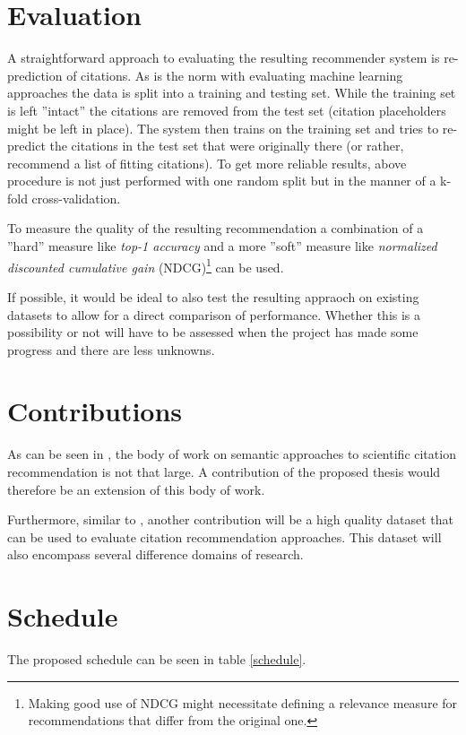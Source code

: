 \documentclass{proseminar}
\begin{document}
\section{Evaluation}
A straightforward approach to evaluating the resulting recommender system is re-prediction of citations. As is the norm with evaluating machine learning approaches the data is split into a training and testing set. While the training set is left ''intact'' the citations are removed from the test set (citation placeholders might be left in place). The system then trains on the training set and tries to re-predict the citations in the test set that were originally there (or rather, recommend a list of fitting citations). To get more reliable results, above procedure is not just performed with one random split but in the manner of a k-fold cross-validation.

To measure the quality of the resulting recommendation a combination of a ''hard'' measure like \emph{top-1 accuracy} and a more ''soft'' measure like \emph{normalized discounted cumulative gain} (NDCG)\footnote{Making good use of NDCG might necessitate defining a relevance measure for recommendations that differ from the original one.} can be used.

If possible, it would be ideal to also test the resulting appraoch on existing datasets to allow for a direct comparison of performance. Whether this is a possibility or not will have to be assessed when the project has made some progress and there are less unknowns.

\section{Contributions}
As can be seen in \cite{Faerber}, the body of work on semantic approaches to scientific citation recommendation is not that large. A contribution of the proposed thesis would therefore be an extension of this body of work.

Furthermore, similar to \cite{Faerber2018}, another contribution will be a high quality dataset that can be used to evaluate citation recommendation approaches. This dataset will also encompass several difference domains of research.

\section{Schedule}
The proposed schedule can be seen in table \ref{schedule}.
\end{document}
